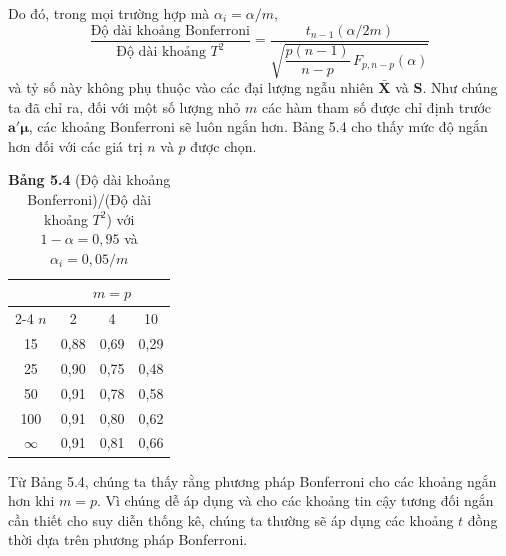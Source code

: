 Do đó, trong mọi trường hợp mà $\alpha_i = \alpha/m$,
\begin{equation*}
  \tag{5-30}
  \frac{\text{Độ dài khoảng Bonferroni}}{\text{Độ dài khoảng } T^2}
  = \frac{t_{n-1}(\alpha/2m)}
         {\sqrt{\dfrac{p(n-1)}{n-p}\,F_{p,n-p}(\alpha)}}
\end{equation*}
và tỷ số này không phụ thuộc vào các đại lượng ngẫu nhiên $\bar{\mathbf{X}}$
và $\mathbf{S}$. Như chúng ta đã chỉ ra, đối với một số lượng nhỏ $m$ các hàm
tham số được chỉ định trước $\mathbf{a}'\boldsymbol{\mu}$, các khoảng Bonferroni
sẽ luôn ngắn hơn. Bảng 5.4 cho thấy mức độ ngắn hơn đối với các giá trị $n$ và
$p$ được chọn.
 
\begin{table}[htbp]
\centering
\caption*{\textbf{Bảng 5.4} (Độ dài khoảng Bonferroni)/(Độ dài khoảng $T^2$) với $1-\alpha = 0{,}95$ và $\alpha_i = 0{,}05/m$}
\vspace{0.3em}
\begin{tabular}{c|ccc}
\hline
 & \multicolumn{3}{c}{$m = p$} \\ \cline{2-4}
$n$ & 2 & 4 & 10 \\ \hline
15 & 0,88 & 0,69 & 0,29 \\
25 & 0,90 & 0,75 & 0,48 \\
50 & 0,91 & 0,78 & 0,58 \\
100 & 0,91 & 0,80 & 0,62 \\
$\infty$ & 0,91 & 0,81 & 0,66 \\
\hline
\end{tabular}
\end{table}
 
Từ Bảng 5.4, chúng ta thấy rằng phương pháp Bonferroni cho các khoảng ngắn hơn
khi $m = p$. Vì chúng dễ áp dụng và cho các khoảng tin cậy tương đối ngắn cần
thiết cho suy diễn thống kê, chúng ta thường sẽ áp dụng các khoảng $t$ đồng thời
dựa trên phương pháp Bonferroni.
